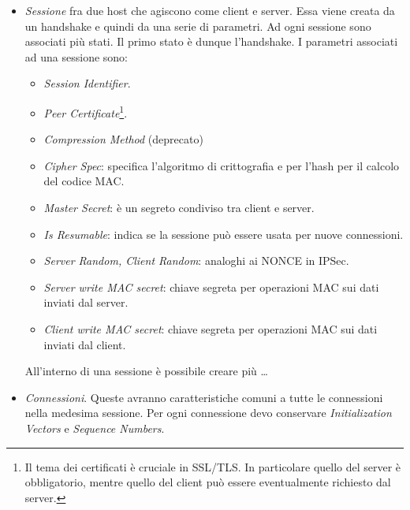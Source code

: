 \documentclass[14pt]{extreport}
\begin{document}
\begin{itemize}
    \item \textit{Sessione} fra due host che agiscono come client e server. Essa viene creata da un handshake e quindi da una serie di parametri. Ad ogni sessione sono associati più stati. Il primo stato è dunque l'handshake. I parametri associati ad una sessione sono:
    
    \begin{itemize}
        \item \textit{Session Identifier}.
        
        \item \textit{Peer Certificate}\footnote{Il tema dei certificati è cruciale in SSL/TLS. In particolare quello del server è obbligatorio, mentre quello del client può essere eventualmente richiesto dal server.}.
        
        \item \textit{Compression Method} (deprecato)
        
        \item \textit{Cipher Spec}: specifica l'algoritmo di crittografia e per l'hash per il calcolo del codice MAC.
        
        \item \textit{Master Secret}: è un segreto condiviso tra client e server.
        
        \item \textit{Is Resumable}: indica se la sessione può essere usata per nuove connessioni.
        
        
        \item \textit{Server Random, Client Random}: analoghi ai NONCE in IPSec.
        
        \item \textit{Server write MAC secret}: chiave segreta per operazioni MAC sui dati inviati dal server.
        
        \item \textit{Client write MAC secret}: chiave segreta per operazioni MAC sui dati inviati dal client.
    \end{itemize}
    
    All'interno di una sessione è possibile creare più \ldots
    
    \item \textit{Connessioni}. Queste avranno caratteristiche comuni a tutte le connessioni nella medesima sessione.
    Per ogni connessione devo conservare \textit{Initialization Vectors} e \textit{Sequence Numbers}.
\end{itemize}
\end{document}
